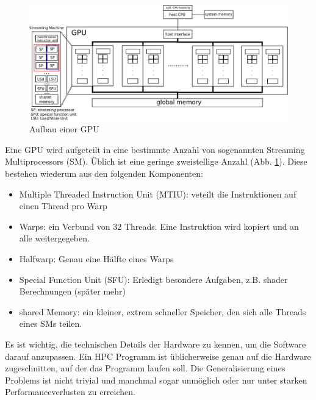 		\begin{figure}[h]
			\centering
    		\includegraphics[width=\textwidth]{chapter2/pictures/sm.jpg}
    		\caption[GPU]{Aufbau einer GPU}
    		\label{2:gpu}
		\end{figure}
		
		Eine GPU wird aufgeteilt in eine bestimmte Anzahl von sogenannten Streaming Multiprocessors (\Gls{SM}). Üblich ist eine geringe zweistellige Anzahl (Abb. \ref{2:gpu}). Diese bestehen wiederum aus den folgenden Komponenten:
		
		\begin{itemize}
		\item Multiple Threaded Instruction Unit (\Gls{MTIU}): veteilt die Instruktionen auf einen \Gls{Thread} pro \Gls{Warp}
		\item \Glspl{Warp}: ein Verbund von 32 \Glspl{Thread}. Eine Instruktion wird kopiert und an alle weitergegeben.
		\item \Gls{Halfwarp}: Genau eine Hälfte eines \glspl{Warp}
		\item Special Function Unit (SFU): Erledigt besondere Aufgaben, z.B. shader Berechnungen (später mehr) 
		\item \Gls{shared Memory}: ein kleiner, extrem schneller Speicher, den sich alle \Glspl{Thread} eines \Gls{SM}s teilen.
		\end{itemize}

		Es ist wichtig, die technischen Details der Hardware zu kennen, um die Software darauf anzupassen. Ein HPC Programm ist üblicherweise genau auf die Hardware zugeschnitten, auf der das Programm laufen soll. Die Generalisierung eines Problems ist nicht trivial und manchmal sogar unmöglich oder nur unter starken \Gls{Performance}verlusten zu erreichen.	